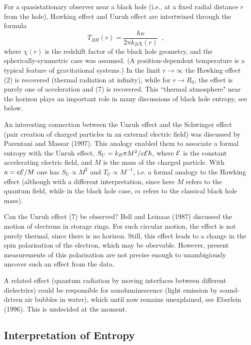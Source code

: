 \documentclass[12pt]{article}
\newcommand{\be}{\begin{equation}}
\newcommand{\ee}{\end{equation}}
\begin{document}
For a quasistationary observer near a black hole (i.e., at
a fixed radial distance $r$ from the hole), Hawking effect and
Unruh effect are intertwined through the formula
\be T_{BH}(r)=\frac{\hbar\kappa}{2\pi k_B\chi(r)} \enspace , \ee
where $\chi(r)$ is the redshift factor of the black hole geometry,
and the spherically-symmetric case was assumed.
(A position-dependent temperature is a typical feature of
gravitational systems.)
In the limit $r\to\infty$ the Hawking effect (2) is recovered
(thermal radiation at infinity), while for $r\to R_0$, the
effect is purely one of acceleration and (7) is recovered.
This ``thermal atmosphere" near the horizon plays an important role
in many discussions of black hole entropy, see below.

An interesting connection between the Unruh effect and the
Schwinger effect (pair creation of charged particles in an external
electric field) was discussed by Parentani and Massar (1997).
This analogy enabled them to associate a formal entropy with
the Unruh effect, $S_U=k_B\pi M^2/e{\cal E}\hbar$,
 where ${\cal E}$ is the constant accelerating electric field,
and $M$ is the mass of the charged particle. With $a=e{\cal E}/M$
one has $S_U\propto M^2$ and $T_U\propto M^{-1}$, i.e. a formal analogy
to the Hawking effect (although with a different interpretation,
since here $M$ refers to the quantum field, while in the
black hole case, $m$ refers to the classical black hole mass).

\vskip 2mm

Can the Unruh effect (7) be observed? Bell and Leinaas (1987)
discussed the motion of electrons in storage rings. For such circular
motion, the effect is not purely thermal, since there is no horizon.
Still, this effect leads to a change in the spin polarisation of
the electron, which may be obervable. However, present measurements
of this polarisation are not precise enough to unambigiously 
uncover such an effect from the data.

A related effect (quantum radiation by moving interfaces between
different dielectrics) could be responsible for sonoluminescence
(light emission by sound-driven air bubbles in water), which 
until now remains unexplained, see Eberlein (1996). This is
undecided at the moment.

\normalsize  

\subsection{Interpretation of Entropy}
\end{document}
